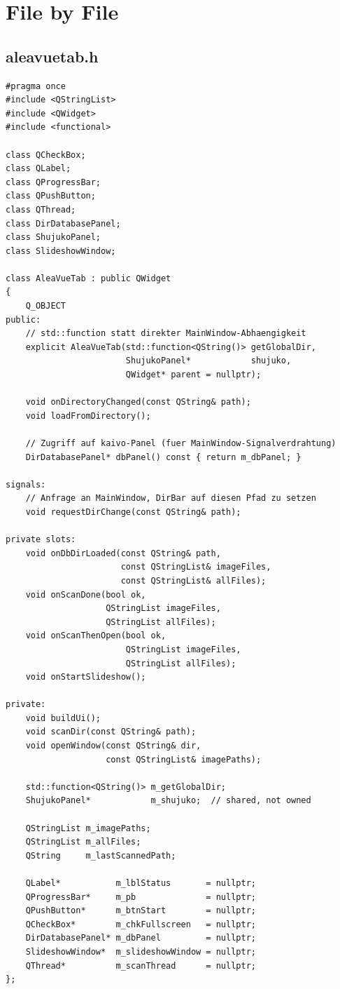 \section{File by File}

\subsection{aleavuetab.h}

\begin{lstlisting}[style=header, caption={aleavuetab.h}]
#pragma once
#include <QStringList>
#include <QWidget>
#include <functional>

class QCheckBox;
class QLabel;
class QProgressBar;
class QPushButton;
class QThread;
class DirDatabasePanel;
class ShujukoPanel;
class SlideshowWindow;

class AleaVueTab : public QWidget
{
    Q_OBJECT
public:
    // std::function statt direkter MainWindow-Abhaengigkeit
    explicit AleaVueTab(std::function<QString()> getGlobalDir,
                        ShujukoPanel*            shujuko,
                        QWidget* parent = nullptr);

    void onDirectoryChanged(const QString& path);
    void loadFromDirectory();

    // Zugriff auf kaivo-Panel (fuer MainWindow-Signalverdrahtung)
    DirDatabasePanel* dbPanel() const { return m_dbPanel; }

signals:
    // Anfrage an MainWindow, DirBar auf diesen Pfad zu setzen
    void requestDirChange(const QString& path);

private slots:
    void onDbDirLoaded(const QString& path,
                       const QStringList& imageFiles,
                       const QStringList& allFiles);
    void onScanDone(bool ok,
                    QStringList imageFiles,
                    QStringList allFiles);
    void onScanThenOpen(bool ok,
                        QStringList imageFiles,
                        QStringList allFiles);
    void onStartSlideshow();

private:
    void buildUi();
    void scanDir(const QString& path);
    void openWindow(const QString& dir,
                    const QStringList& imagePaths);

    std::function<QString()> m_getGlobalDir;
    ShujukoPanel*            m_shujuko;  // shared, not owned

    QStringList m_imagePaths;
    QStringList m_allFiles;
    QString     m_lastScannedPath;

    QLabel*           m_lblStatus       = nullptr;
    QProgressBar*     m_pb              = nullptr;
    QPushButton*      m_btnStart        = nullptr;
    QCheckBox*        m_chkFullscreen   = nullptr;
    DirDatabasePanel* m_dbPanel         = nullptr;
    SlideshowWindow*  m_slideshowWindow = nullptr;
    QThread*          m_scanThread      = nullptr;
};
\end{lstlisting}

